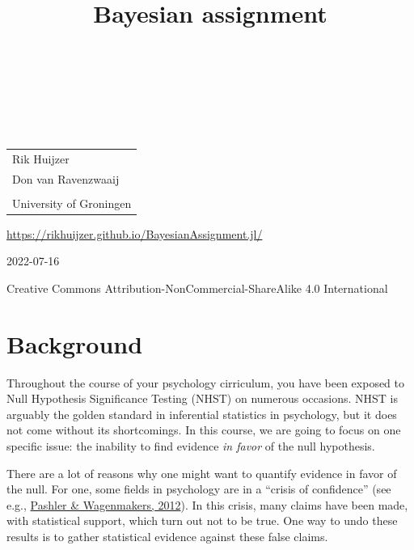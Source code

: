 \documentclass[
  notoc %
]{tufte-book}
\title{Bayesian assignment}
\author{\noindent{Rik Huijzer}\\[3mm] \noindent{Don van
Ravenzwaaij}\\[3mm] }
\date{}
\begin{document}
\makeatletter
\thispagestyle{empty}
\vfill
{\Huge\bf
\noindent
\@title
}\\[1in]
{\Large
\noindent
\@author
}
\makeatother

\makeatletter
\newpage
\thispagestyle{empty}
\vfill
{\noindent
\begin{tabular}{l}
Rik Huijzer \\
Don van Ravenzwaaij \\
\\
University of Groningen
\end{tabular}
}
\vfill
{\small
\url{https://rikhuijzer.github.io/BayesianAssignment.jl/}

2022-07-16

Creative Commons Attribution-NonCommercial-ShareAlike 4.0 International
}
\makeatother


\frontmatter
\mainmatter

\setcounter{tocdepth}{1}
\tableofcontents

\justifying

\setlength{\parindent}{0pt}

\hypertarget{sec:background}{%
\chapter{Background}\label{sec:background}}

Throughout the course of your psychology cirriculum, you have been
exposed to Null Hypothesis Significance Testing (NHST) on numerous
occasions. NHST is arguably the golden standard in inferential
statistics in psychology, but it does not come without its shortcomings.
In this course, we are going to focus on one specific issue: the
inability to find evidence \emph{in favor} of the null hypothesis.

There are a lot of reasons why one might want to quantify evidence in
favor of the null. For one, some fields in psychology are in a ``crisis
of confidence'' (see e.g.,
\protect\hyperlink{ref-pashler2012editors}{Pashler \& Wagenmakers,
2012}). In this crisis, many claims have been made, with statistical
support, which turn out not to be true. One way to undo these results is
to gather statistical evidence against these false claims.
\end{document}
